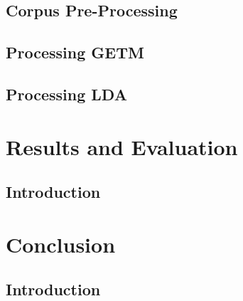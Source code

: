 \documentclass[10pt]{report}
\begin{document}
\section{Corpus Pre-Processing}

\section{Processing GETM}

\section{Processing LDA}

%
%
%
%
%
\chapter{Results and Evaluation}
\section{Introduction}

%
%
%
%
%
\chapter{Conclusion}
\section{Introduction}

\renewcommand{\baselinestretch}{1.0}\normalsize


\end{document}
